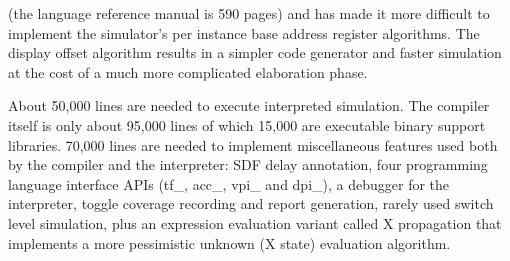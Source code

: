\documentclass[preprint, authoryear]{sigplanconf}
\begin{document}
(the language reference manual is 590 pages) and has made it more difficult
to implement the simulator's per instance base address register algorithms.
The  display offset algorithm results in a simpler code generator
and faster simulation at the cost of a much more complicated
elaboration phase.
\par
About 50,000 lines are needed to execute interpreted simulation.
The compiler itself is only about 95,000 lines of which 15,000
are executable binary support libraries.
70,000 lines are needed to implement miscellaneous features used
both by the compiler and the interpreter: SDF delay annotation,
four programming language interface APIs (tf_, acc_, vpi_ and dpi_),
a debugger for the interpreter, toggle coverage recording and report
generation, rarely used switch level simulation, plus an expression
evaluation variant called X propagation that implements a more
pessimistic unknown (X state) evaluation algorithm.
\end{document}
